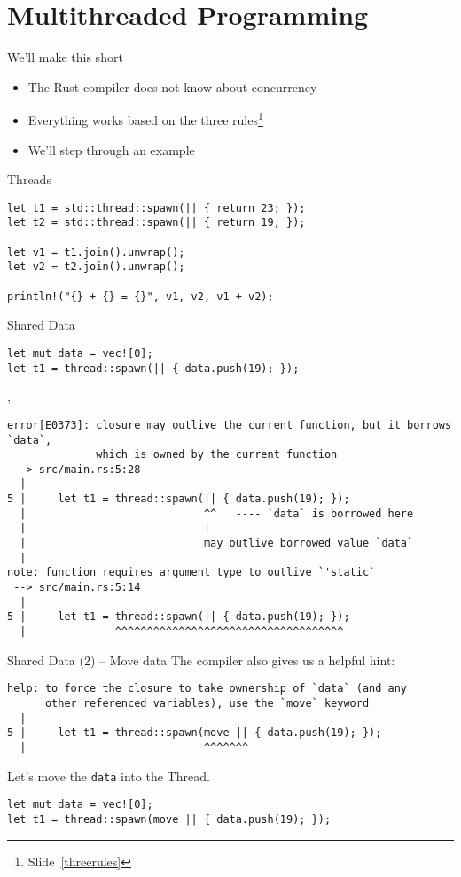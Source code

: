 \section{Multithreaded Programming}

\begin{frame}{We'll make this short}
\begin{itemize}
  \item The Rust compiler does not know about concurrency
  \item Everything works based on the three rules\footnote{Slide~\ref{threerules}}
  \item We'll step through an example
\end{itemize}
\end{frame}

\begin{frame}[fragile]{Threads}
\begin{verbatim}
let t1 = std::thread::spawn(|| { return 23; });
let t2 = std::thread::spawn(|| { return 19; });

let v1 = t1.join().unwrap();
let v2 = t2.join().unwrap();

println!("{} + {} = {}", v1, v2, v1 + v2);
\end{verbatim}
\end{frame}

\begin{frame}[fragile]{Shared Data}
\begin{verbatim}
let mut data = vec![0];
let t1 = thread::spawn(|| { data.push(19); });
\end{verbatim}
\sep
\begin{verbatim}
error[E0373]: closure may outlive the current function, but it borrows `data`,
              which is owned by the current function
 --> src/main.rs:5:28
  |
5 |     let t1 = thread::spawn(|| { data.push(19); });
  |                            ^^   ---- `data` is borrowed here
  |                            |
  |                            may outlive borrowed value `data`
  |
note: function requires argument type to outlive `'static`
 --> src/main.rs:5:14
  |
5 |     let t1 = thread::spawn(|| { data.push(19); });
  |              ^^^^^^^^^^^^^^^^^^^^^^^^^^^^^^^^^^^^
\end{verbatim}
\end{frame}

\begin{frame}[fragile]{Shared Data (2) -- Move data}
The compiler also gives us a helpful hint:
\begin{verbatim}
help: to force the closure to take ownership of `data` (and any
      other referenced variables), use the `move` keyword
  |
5 |     let t1 = thread::spawn(move || { data.push(19); });
  |                            ^^^^^^^
\end{verbatim}
Let's move the \texttt{data} into the Thread.
\begin{verbatim}
let mut data = vec![0];
let t1 = thread::spawn(move || { data.push(19); });
\end{verbatim}
\end{frame}

